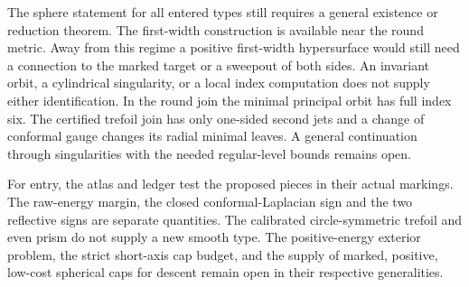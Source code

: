 \documentclass[11pt,letterpaper]{article}
\numberwithin{equation}{section}
\theoremstyle{definition}
\begin{document}
The sphere statement for all entered types still requires a general
existence or reduction theorem. The first-width construction is available
near the round metric. Away from this regime a positive first-width
hypersurface would still need a connection to the marked target or a
sweepout of both sides. An invariant orbit, a cylindrical singularity,
or a local index computation does not supply either identification.
In the round join the minimal principal orbit has full index six.
The certified trefoil join has only one-sided second jets and a change
of conformal gauge changes its radial minimal leaves. A general
continuation through singularities with the needed regular-level
bounds remains open.

For entry, the atlas and ledger test the proposed pieces in their actual
markings. The raw-energy margin, the closed conformal-Laplacian sign
and the two reflective signs are separate quantities. The calibrated
circle-symmetric trefoil and even prism do not supply a new smooth type.
The positive-energy exterior problem, the strict short-axis cap budget,
and the supply of marked, positive, low-cost spherical caps for descent
remain open in their respective generalities.


\end{document}
